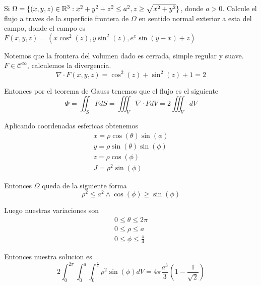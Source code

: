 \documentclass[../main.tex]{subfiles}
\begin{document}
\begin{problem}
Si $\Omega = \{(x, y, z) \in \mathbb{R}^{3} : x^{2} + y^{2} + z^{2} \leq a^{2}, z \geq \sqrt{x^{2} + y^{2}}\}$, donde $a > 0$. Calcule el flujo a traves de la superficie frontera de $\Omega$ en sentido normal exterior a esta del campo, donde el campo es $F(x, y, z) = (x \cos^{2}(z), y \sin^{2}(z), e^{x}\sin(y - x) + z)$
\end{problem}
\begin{solution}
Notemos que la frontera del volumen dado es cerrada, simple regular y suave. $F \in \mathcal{C}^{\infty}$, calculemos la divergencia.
\begin{equation*}
\nabla \cdot F(x, y, z) = \cos^{2}(z) + \sin^{2}(z) + 1 = 2
\end{equation*}

Entonces por el teorema de Gauss tenemos que el flujo es el siguiente
\begin{equation*}
\Phi = \iint_{S} F dS = \iiint_{V} \nabla \cdot F dV = 2 \iiint_{V} dV
\end{equation*}

Aplicando coordenadas esfericas obtenemos
\begin{gather*}
  x = \rho \cos(\theta) \sin(\phi)\\
  y = \rho \sin(\theta) \sin(\phi)\\
  z = \rho \cos(\phi)\\
  J = \rho^{2} \sin(\phi)
\end{gather*}

Entonces $\Omega$ queda de la siguiente forma
\begin{equation*}
  \rho^{2} \leq a^{2} \land \cos(\phi) \geq \sin(\phi)
\end{equation*}

Luego nuestras variaciones son
\begin{gather*}
  0 \leq \theta \leq 2\pi\\
  0 \leq \rho \leq a\\
  0 \leq \phi \leq \frac{\pi}{4}
\end{gather*}

Entonces nuestra solucion es
\begin{equation*}
2 \int_{0}^{2\pi}\int_{0}^{a}\int_{0}^{\frac{\pi}{4}} \rho^{2} \sin(\phi) dV = 4\pi \frac{a^{3}}{3} (1 - \frac{1}{\sqrt{2}})
\end{equation*}
\end{solution}
\end{document}
